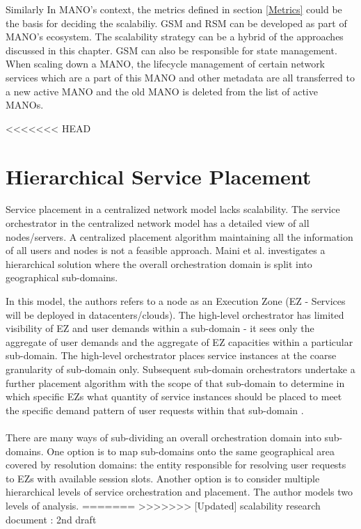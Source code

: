 Similarly In MANO's context, the metrics defined in section \ref{Metrics} could be the basis for deciding the scalabiliy. GSM and RSM can be developed as part of MANO's ecosystem. The scalability strategy can be a hybrid of the approaches discussed in this chapter.
GSM can also be responsible for state management. When scaling down a MANO, the lifecycle management of certain network services which are a part of this MANO and other metadata are all transferred to a new active  MANO and the old MANO is deleted from the list of active MANOs.

<<<<<<< HEAD
\newpage
\section{Hierarchical Service Placement}
Service placement in a centralized network model lacks scalability. The service orchestrator in the centralized network model has a detailed view of all nodes/servers. A centralized placement algorithm maintaining all the information of all users and nodes is not a feasible approach. Maini et al. \cite{maini_hierarchical_2016} investigates a hierarchical solution where the overall orchestration domain is split into geographical sub-domains.

In this model, the authors refers to a node as an Execution Zone (EZ - Services will be deployed in datacenters/clouds). The high-level orchestrator has limited visibility of EZ and user demands within a sub-domain - it sees only the aggregate of user demands and the aggregate of EZ capacities within a particular sub-domain. The high-level orchestrator places service instances at the coarse granularity of sub-domain only. Subsequent sub-domain orchestrators undertake a further placement algorithm with the scope of that sub-domain to determine in which specific EZs what quantity of service instances should be placed to meet the specific demand pattern of user requests within that sub-domain \cite{maini_hierarchical_2016}.

\paragraph{}There are many ways of sub-dividing an overall orchestration domain into sub-domains. One option is to map sub-domains onto the same geographical area covered by resolution domains: the entity responsible for resolving user requests to EZs with available session slots. Another option is to consider multiple hierarchical levels of service orchestration and placement. The author models two levels of analysis.
=======
>>>>>>> [Updated] scalability research document : 2nd draft

 
 
